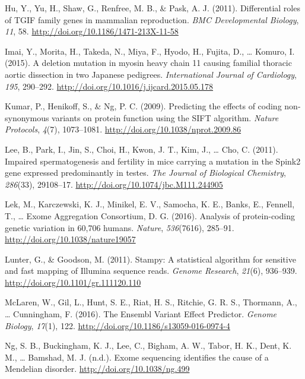 \documentclass[12pt,twoside]{reedthesis}
\theoremstyle{definition}
\theoremstyle{definition}
\theoremstyle{remark}
\begin{document}
  \hypertarget{ref-Hu2011}{}
  Hu, Y., Yu, H., Shaw, G., Renfree, M. B., \& Pask, A. J. (2011).
  Differential roles of TGIF family genes in mammalian reproduction.
  \emph{BMC Developmental Biology}, \emph{11}, 58.
  \url{http://doi.org/10.1186/1471-213X-11-58}
  
  \hypertarget{ref-Imai2015}{}
  Imai, Y., Morita, H., Takeda, N., Miya, F., Hyodo, H., Fujita, D.,
  \ldots{} Komuro, I. (2015). A deletion mutation in myosin heavy chain 11
  causing familial thoracic aortic dissection in two Japanese pedigrees.
  \emph{International Journal of Cardiology}, \emph{195}, 290--292.
  \url{http://doi.org/10.1016/j.ijcard.2015.05.178}
  
  \hypertarget{ref-Kumar2009}{}
  Kumar, P., Henikoff, S., \& Ng, P. C. (2009). Predicting the effects of
  coding non-synonymous variants on protein function using the SIFT
  algorithm. \emph{Nature Protocols}, \emph{4}(7), 1073--1081.
  \url{http://doi.org/10.1038/nprot.2009.86}
  
  \hypertarget{ref-Lee2011}{}
  Lee, B., Park, I., Jin, S., Choi, H., Kwon, J. T., Kim, J., \ldots{}
  Cho, C. (2011). Impaired spermatogenesis and fertility in mice carrying
  a mutation in the Spink2 gene expressed predominantly in testes.
  \emph{The Journal of Biological Chemistry}, \emph{286}(33), 29108--17.
  \url{http://doi.org/10.1074/jbc.M111.244905}
  
  \hypertarget{ref-Lek2016}{}
  Lek, M., Karczewski, K. J., Minikel, E. V., Samocha, K. E., Banks, E.,
  Fennell, T., \ldots{} Exome Aggregation Consortium, D. G. (2016).
  Analysis of protein-coding genetic variation in 60,706 humans.
  \emph{Nature}, \emph{536}(7616), 285--91.
  \url{http://doi.org/10.1038/nature19057}
  
  \hypertarget{ref-Lunter2011}{}
  Lunter, G., \& Goodson, M. (2011). Stampy: A statistical algorithm for
  sensitive and fast mapping of Illumina sequence reads. \emph{Genome
  Research}, \emph{21}(6), 936--939.
  \url{http://doi.org/10.1101/gr.111120.110}
  
  \hypertarget{ref-McLaren2016}{}
  McLaren, W., Gil, L., Hunt, S. E., Riat, H. S., Ritchie, G. R. S.,
  Thormann, A., \ldots{} Cunningham, F. (2016). The Ensembl Variant Effect
  Predictor. \emph{Genome Biology}, \emph{17}(1), 122.
  \url{http://doi.org/10.1186/s13059-016-0974-4}
  
  \hypertarget{ref-Ng}{}
  Ng, S. B., Buckingham, K. J., Lee, C., Bigham, A. W., Tabor, H. K.,
  Dent, K. M., \ldots{} Bamshad, M. J. (n.d.). Exome sequencing identifies
  the cause of a Mendelian disorder. \url{http://doi.org/10.1038/ng.499}
  
\end{document}
